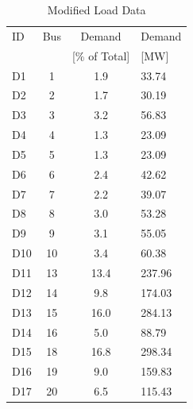 \documentclass[lettersize,journal]{IEEEtran}
\begin{document}
\begin{table}[H]
    \centering
    \caption{Modified Load Data}
    \label{tab:ieee24_load_data}
    \begin{tabularx}{0.6\columnwidth}{l c c X}
        \toprule
        ID & Bus &Demand           & Demand\\
            &     &[\% of Total]   & [MW]  \\
        \midrule
        D1   & 1  &  1.9 &  33.74 \\
        D2   & 2  &  1.7 &  30.19 \\
        D3   & 3  &  3.2 &  56.83 \\
        D4   & 4  &  1.3 &  23.09 \\
        D5   & 5  &  1.3 &  23.09 \\
        D6   & 6  &  2.4 &  42.62 \\
        D7   & 7  &  2.2 &  39.07 \\
        D8   & 8  &  3.0 &  53.28 \\
        D9   & 9  &  3.1 &  55.05 \\
        D10  & 10 &  3.4 &  60.38 \\
        D11  & 13 & 13.4 & 237.96 \\
        D12  & 14 &  9.8 & 174.03 \\
        D13  & 15 & 16.0 & 284.13 \\
        D14  & 16 &  5.0 &  88.79 \\
        D15  & 18 & 16.8 & 298.34 \\
        D16  & 19 &  9.0 & 159.83 \\
        D17  & 20 &  6.5 & 115.43 \\
        \bottomrule
    \end{tabularx}
\end{table}
\end{document}
